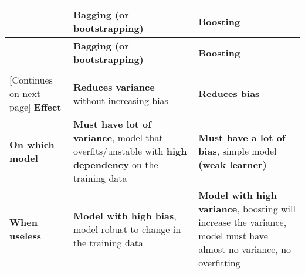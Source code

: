     \begin{tabularx}{\linewidth}{p{}|X|X}
        \toprule
        \textbf{} & \textbf{Bagging (or bootstrapping)} & \textbf{Boosting}\\
        \midrule
        \endfirsthead
        \toprule
        \textbf{} & \textbf{Bagging (or bootstrapping)} & \textbf{Boosting}\\
        \\
        \midrule
        \endhead
        \midrule
        \footnotesize [Continues on next page]
        \endfoot
        \bottomrule
        \endlastfoot
        \textbf{Effect} & \textbf{Reduces variance} without increasing bias & \textbf{Reduces bias}\\ \midrule

        \textbf{On which model} & \textbf{Must have lot of variance}, model that overfits/unstable with \textbf{high dependency} on the training data & \textbf{Must have a lot of bias}, simple model \textbf{(weak learner)}\\ \midrule

        \textbf{When useless} & \textbf{Model with high bias}, model robust to change in the training data & \textbf{Model with high variance}, boosting will increase the variance, model must have almost no variance, no overfitting\\ \midrule


\end{tabularx}
